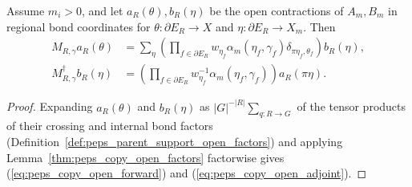 \begin{lemma}%
    \label{thm:peps_copy_open_generators}
    \leanok
    Assume $m_i>0$, and let $a_R(\theta),b_R(\eta)$ be the open contractions of $A_m,B_m$ in regional bond coordinates for $\theta:\partial E_R\to X$ and $\eta:\partial E_R\to X_m$. Then
    \begin{align}
        M_{R,\gamma}a_R(\theta)
         & =\sum_\eta\left(\prod_{f\in\partial E_R}
        w_{\eta_f}\alpha_m(\eta_f,\gamma_f)
        \delta_{\pi\eta_f,\theta_f}\right)b_R(\eta),
        \label{eq:peps_copy_open_forward}           \\
        M_{R,\gamma}^\dagger b_R(\eta)
         & =\left(\prod_{f\in\partial E_R}
        w_{\eta_f}^{-1}\alpha_m(\eta_f,\gamma_f)\right)
        a_R(\pi\eta).
        \label{eq:peps_copy_open_adjoint}
    \end{align}
\end{lemma}
\begin{proof}\leanok
    Expanding $a_R(\theta)$ and $b_R(\eta)$ as $|G|^{-|R|}\sum_{q:R\to G}$ of the tensor products of their crossing and internal bond factors (Definition~\ref{def:peps_parent_support_open_factors}) and applying Lemma~\ref{thm:peps_copy_open_factors} factorwise gives (\ref{eq:peps_copy_open_forward}) and (\ref{eq:peps_copy_open_adjoint}).
\end{proof}

